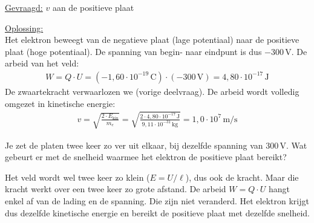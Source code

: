 \documentclass{ximera}
\begin{document}
\begin{exercise}
\begin{question}
\begin{solution}
            \underline{Gevraagd:} $v$ aan de positieve plaat

            \underline{Oplossing:}\\
            Het elektron beweegt van de negatieve plaat (lage potentiaal) naar de positieve plaat (hoge potentiaal). De spanning van begin- naar eindpunt is dus $-300 \, \mathrm{V}$. De arbeid van het veld:
            \begin{align*}
                W = Q \cdot U = (-1{,}60 \cdot 10^{-19} \, \mathrm{C}) \cdot (-300 \, \mathrm{V}) = 4{,}80 \cdot 10^{-17} \, \mathrm{J}
            \end{align*}
            De zwaartekracht verwaarlozen we (vorige deelvraag). De arbeid wordt volledig omgezet in kinetische energie:
            \begin{align*}
                v = \sqrt{\frac{2 \cdot E_{\text{kin}}}{m_e}} = \sqrt{\frac{2 \cdot 4{,}80 \cdot 10^{-17} \, \mathrm{J}}{9{,}11 \cdot 10^{-31} \, \mathrm{kg}}} = \boxed{1{,}0 \cdot 10^{7} \, \mathrm{m/s}}
            \end{align*}
        \end{solution}
    \end{question}

    \begin{question}
        Je zet de platen twee keer zo ver uit elkaar, bij dezelfde spanning van $300 \, \mathrm{V}$. Wat gebeurt er met de snelheid waarmee het elektron de positieve plaat bereikt?

        \begin{multipleChoice}
        \end{multipleChoice}

        \begin{solution}\nl
            Het veld wordt wel twee keer zo klein ($E = U/\ell$), dus ook de kracht. Maar die kracht werkt over een twee keer zo grote afstand. De arbeid $W = Q \cdot U$ hangt enkel af van de lading en de spanning. Die zijn niet veranderd. Het elektron krijgt dus dezelfde kinetische energie en bereikt de positieve plaat met dezelfde snelheid.
        \end{solution}
    \end{question}
\end{exercise}
\end{document}
